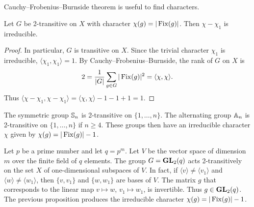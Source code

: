 \chapter{}

Cauchy--Frobenius--Burnside theorem is useful to
find characters. 

\begin{proposition}
    Let $G$ be 2-transitive on $X$ with character $\chi(g)=|\operatorname{Fix}(g)|$.
    Then $\chi-\chi_1$ is irreducible. 
\end{proposition}

\begin{proof}
    In particular, $G$ is transitive on $X$. 
    Since the trivial character $\chi_1$ is irreducible, $\langle\chi_1,\chi_1\rangle=1$. 
    By Cauchy--Frobenius--Burnside, the rank of $G$ on $X$ is  
    \begin{gather*}
        2=\frac{1}{|G|}\sum_{g\in G}|\operatorname{Fix}(g)|^2=\langle \chi,\chi\rangle.
   \end{gather*}
   Thus $\langle \chi-\chi_1,\chi-\chi_1\rangle=\langle\chi,\chi\rangle-1-1+1=1$.
\end{proof}

\begin{example}
    The symmetric group $\mathbb{S}_n$ is 2-transitive on $\{1,\dots,n\}$. The
    alternating group $\mathbb{A}_n$ is 2-transitive on $\{1,\dots,n\}$ if 
    $n\geq4$. These groups then have an irreducible character $\chi$ 
    given by $\chi(g)=|\operatorname{Fix}(g)|-1$.
\end{example}

\begin{example}
    Let $p$ be a prime number and let $q=p^{m}$. Let $V$ 
    be the vector space of dimension $m$ 
    over the finite field of $q$ elements. 
    The group $G=\mathbf{GL}_2(q)$ acts 2-transitively on the set $X$ of
    one-dimensional subspaces of $V$. In fact, 
    if $\langle v\rangle\ne\langle v_1\rangle$ and $\langle w\rangle\ne\langle w_1\rangle$, 
    then $\{v,v_1\}$ and $\{w,w_1\}$ are bases of $V$. 
    The matrix $g$ that corresponds to the linear map 
    $v\mapsto w$, $v_1\mapsto w_1$, is invertible. Thus $g\in\mathbf{GL}_2(q)$. 
    The previous proposition produces the irreducible character
    $\chi(g)=|\operatorname{Fix}(g)|-1$. 
\end{example}

